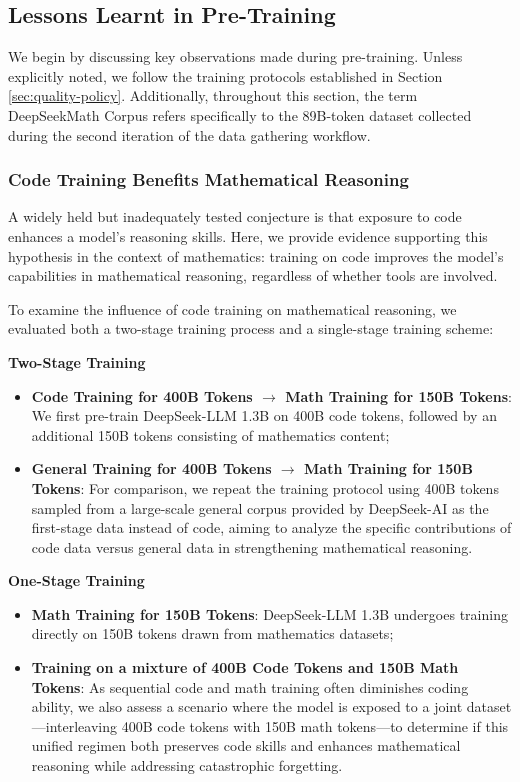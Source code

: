\begin{itemize}[topsep=0pt]
\subsection{Lessons Learnt in Pre-Training}

We begin by discussing key observations made during pre-training. Unless explicitly noted, we follow the training protocols established in Section \ref{sec:quality-policy}. Additionally, throughout this section, the term DeepSeekMath Corpus refers specifically to the 89B-token dataset collected during the second iteration of the data gathering workflow.

\subsubsection{Code Training Benefits Mathematical Reasoning}

A widely held but inadequately tested conjecture is that exposure to code enhances a model’s reasoning skills. Here, we provide evidence supporting this hypothesis in the context of mathematics: training on code improves the model’s capabilities in mathematical reasoning, regardless of whether tools are involved.

To examine the influence of code training on mathematical reasoning, we evaluated both a two-stage training process and a single-stage training scheme:

\textbf{Two-Stage Training}

\begin{itemize}[topsep=0pt]
    \item \textbf{Code Training for 400B Tokens $\rightarrow$ Math Training for 150B Tokens}: We first pre-train DeepSeek-LLM 1.3B on 400B code tokens, followed by an additional 150B tokens consisting of mathematics content;
    \item \textbf{General Training for 400B Tokens $\rightarrow$ Math Training for 150B Tokens}: For comparison, we repeat the training protocol using 400B tokens sampled from a large-scale general corpus provided by DeepSeek-AI as the first-stage data instead of code, aiming to analyze the specific contributions of code data versus general data in strengthening mathematical reasoning.
\end{itemize}

\textbf{One-Stage Training}

\begin{itemize}[topsep=0pt]
    \item \textbf{Math Training for 150B Tokens}: DeepSeek-LLM 1.3B undergoes training directly on 150B tokens drawn from mathematics datasets;
    \item \textbf{Training on a mixture of 400B Code Tokens and 150B Math Tokens}: As sequential code and math training often diminishes coding ability, we also assess a scenario where the model is exposed to a joint dataset—interleaving 400B code tokens with 150B math tokens—to determine if this unified regimen both preserves code skills and enhances mathematical reasoning while addressing catastrophic forgetting.
\end{itemize}


\end{itemize}
